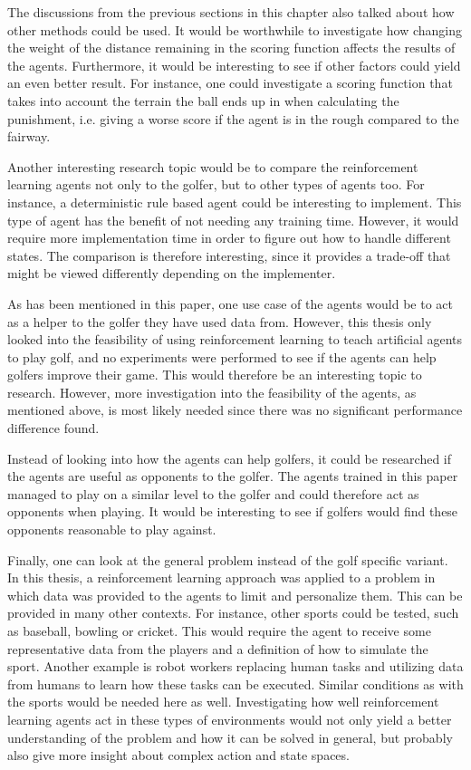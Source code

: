\documentclass{kththesis}
\begin{document}
The discussions from the previous sections in this chapter also talked about how other methods could be used. It would be worthwhile to investigate how changing the weight of the distance remaining in the scoring function affects the results of the agents. Furthermore, it would be interesting to see if other factors could yield an even better result. For instance, one could investigate a scoring function that takes into account the terrain the ball ends up in when calculating the punishment, i.e. giving a worse score if the agent is in the rough compared to the fairway. 

Another interesting research topic would be to compare the reinforcement learning agents not only to the golfer, but to other types of agents too. For instance, a deterministic rule based agent could be interesting to implement. This type of agent has the benefit of not needing any training time. However, it would require more implementation time in order to figure out how to handle different states. The comparison is therefore interesting, since it provides a trade-off that might be viewed differently depending on the implementer.

As has been mentioned in this paper, one use case of the agents would be to act as a helper to the golfer they have used data from. However, this thesis only looked into the feasibility of using reinforcement learning to teach artificial agents to play golf, and no experiments were performed to see if the agents can help golfers improve their game. This would therefore be an interesting topic to research. However, more investigation into the feasibility of the agents, as mentioned above, is most likely needed since there was no significant performance difference found. 

Instead of looking into how the agents can help golfers, it could be researched if the agents are useful as opponents to the golfer. The agents trained in this paper managed to play on a similar level to the golfer and could therefore act as opponents when playing. It would be interesting to see if golfers would find these opponents reasonable to play against.

Finally, one can look at the general problem instead of the golf specific variant. In this thesis, a reinforcement learning approach was applied to a problem in which data was provided to the agents to limit and personalize them. This can be provided in many other contexts. For instance, other sports could be tested, such as baseball, bowling or cricket. This would require the agent to receive some representative data from the players and a definition of how to simulate the sport. Another example is robot workers replacing human tasks and utilizing data from humans to learn how these tasks can be executed. Similar conditions as with the sports would be needed here as well. Investigating how well reinforcement learning agents act in these types of environments would not only yield a better understanding of the problem and how it can be solved in general, but probably also give more insight about complex action and state spaces.
\end{document}
